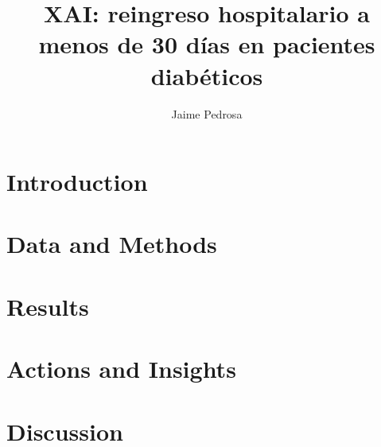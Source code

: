 \documentclass[11pt,a4paper]{article}
\title{XAI: reingreso hospitalario a menos de 30 días en pacientes diabéticos}
\author{Jaime Pedrosa}
\date{}
\begin{document}
\maketitle

\section{Introduction}

\section{Data and Methods}

\section{Results}

\section{Actions and Insights}

\section{Discussion}

\nocite{*}


\end{document}
